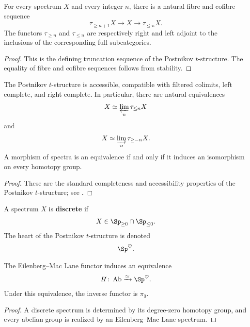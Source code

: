 \begin{proposition}
\label{prop:postnikov-truncation-triangle}
For every spectrum $X$ and every integer $n$, there is a natural fibre and
cofibre sequence
\[
    \tau_{\geq n+1}X
    \longrightarrow
    X
    \longrightarrow
    \tau_{\leq n}X.
\]
The functors $\tau_{\geq n}$ and $\tau_{\leq n}$ are respectively right
and left adjoint to the inclusions of the corresponding full
subcategories.
\end{proposition}

\begin{proof}
This is the defining truncation sequence of the Postnikov $t$-structure.
The equality of fibre and cofibre sequences follows from stability.
\end{proof}

\begin{proposition}
\label{prop:postnikov-completeness-detection}
The Postnikov $t$-structure is accessible, compatible with filtered
colimits, left complete, and right complete. In particular, there are
natural equivalences
\[
    X
    \simeq
    \varprojlim_n\tau_{\leq n}X
\]
and
\[
    X
    \simeq
    \varinjlim_n\tau_{\geq -n}X.
\]
A morphism of spectra is an equivalence if and only if it induces an
isomorphism on every homotopy group.
\end{proposition}

\begin{proof}
These are the standard completeness and accessibility properties of the
Postnikov $t$-structure; see \cite{LurieHigherAlgebra}.
\end{proof}

\begin{definition}
\label{def:discrete-spectrum}
A spectrum $X$ is \textbf{discrete} if
\[
    X\in\Sp_{\geq0}\cap\Sp_{\leq0}.
\]
The heart of the Postnikov $t$-structure is denoted
\[
    \Sp^\heartsuit.
\]
\end{definition}

\begin{proposition}
\label{prop:eilenberg-mac-lane-heart}
The Eilenberg--Mac Lane functor induces an equivalence
\[
    H
    \colon
    \operatorname{Ab}
    \xrightarrow{\simeq}
    \Sp^\heartsuit.
\]
Under this equivalence, the inverse functor is $\pi_0$.
\end{proposition}

\begin{proof}
A discrete spectrum is determined by its degree-zero homotopy group, and
every abelian group is realized by an Eilenberg--Mac Lane spectrum.
\end{proof}

